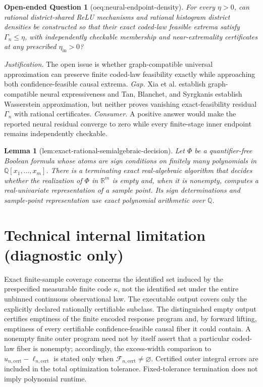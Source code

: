 \documentclass{article}
\newtheorem{lemma}{Lemma}
\newtheorem{openendedquestion}{Open-ended Question}
\begin{document}
\begin{openendedquestion}[oeq:neural-endpoint-density]\label{oeq:neural-endpoint-density}
For every \(\eta>0\), can rational district-shared ReLU mechanisms and rational histogram district densities be constructed so that their exact coded-law feasible extrema satisfy \(\Gamma_n\le\eta\), with independently checkable membership and near-extremality certificates at any prescribed \(\eta_{\mathrm{in}}>0\)?
\end{openendedquestion}
\par\smallskip\noindent \textit{Justification.} The open issue is whether graph-compatible universal approximation can preserve finite coded-law feasibility exactly while approaching both confidence-feasible causal extrema. \textit{Gap.} Xia et al. establish graph-compatible neural expressiveness and Tan, Blanchet, and Syrgkanis establish Wasserstein approximation, but neither proves vanishing exact-feasibility residual \(\Gamma_n\) with rational certificates. \textit{Consumer.} A positive answer would make the reported neural residual converge to zero while every finite-stage inner endpoint remains independently checkable.

\begin{lemma}[lem:exact-rational-semialgebraic-decision]\label{lem:exact-rational-semialgebraic-decision}
Let \(\Phi\) be a quantifier-free Boolean formula whose atoms are sign conditions on finitely many polynomials in \(\mathbb Q[x_1,\ldots,x_m]\).  There is a terminating exact real-algebraic algorithm that decides whether the realization of \(\Phi\) in \(\mathbb R^m\) is empty and, when it is nonempty, computes a real-univariate representation of a sample point.  Its sign determinations and sample-point representation use exact polynomial arithmetic over \(\mathbb Q\).
\end{lemma}

\section*{Technical internal limitation (diagnostic only)}

Exact finite-sample coverage concerns the identified set induced by the prespecified measurable finite code \(\kappa\), not the identified set under the entire unbinned continuous observational law. The executable output covers only the explicitly declared rationally certifiable subclass. The distinguished empty output certifies emptiness of the finite encoded response program and, by forward lifting, emptiness of every certifiable confidence-feasible causal fiber it could contain. A nonempty finite outer program need not by itself assert that a particular coded-law fiber is nonempty; accordingly, the excess-width comparison to \(u_{n,\mathrm{cert}}-\ell_{n,\mathrm{cert}}\) is stated only when \(\mathcal F_{n,\mathrm{cert}}\ne\varnothing\). Certified outer integral errors are included in the total optimization tolerance. Fixed-tolerance termination does not imply polynomial runtime.
\end{document}
